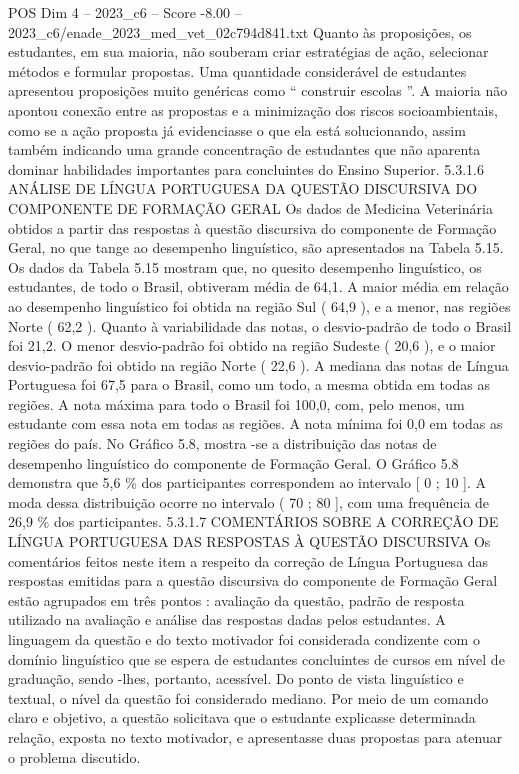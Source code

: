 \begin{textsample}{POS Dim 4 – 2023\_c6 – Score -8.00 – 2023\_c6/enade\_2023\_med\_vet\_02c794d841.txt}
Quanto às proposições, os estudantes, em sua maioria, não souberam criar estratégias de ação, selecionar métodos e formular propostas.
Uma quantidade considerável de estudantes apresentou proposições muito genéricas como “ construir escolas ”.
A maioria não apontou conexão entre as propostas e a minimização dos riscos socioambientais, como se a ação proposta já evidenciasse o que ela está solucionando, assim também indicando uma grande concentração de estudantes que não aparenta dominar habilidades importantes para concluintes do Ensino Superior. 5.3.1.6 ANÁLISE DE LÍNGUA PORTUGUESA DA QUESTÃO DISCURSIVA DO COMPONENTE DE FORMAÇÃO GERAL Os dados de Medicina Veterinária obtidos a partir das respostas à questão discursiva do componente de Formação Geral, no que tange ao desempenho linguístico, são apresentados na Tabela 5.15.
Os dados da Tabela 5.15 mostram que, no quesito desempenho linguístico, os estudantes, de todo o Brasil, obtiveram média de 64,1.
A maior média em relação ao desempenho linguístico foi obtida na região Sul ( 64,9 ), e a menor, nas regiões Norte ( 62,2 ).
Quanto à variabilidade das notas, o desvio-padrão de todo o Brasil foi 21,2.
O menor desvio-padrão foi obtido na região Sudeste ( 20,6 ), e o maior desvio-padrão foi obtido na região Norte ( 22,6 ).
A mediana das notas de Língua Portuguesa foi 67,5 para o Brasil, como um todo, a mesma obtida em todas as regiões.
A nota máxima para todo o Brasil foi 100,0, com, pelo menos, um estudante com essa nota em todas as regiões.
A nota mínima foi 0,0 em todas as regiões do país.
No Gráfico 5.8, mostra -se a distribuição das notas de desempenho linguístico do componente de Formação Geral.
O Gráfico 5.8 demonstra que 5,6 \% dos participantes correspondem ao intervalo [ 0 ; 10 ].
A moda dessa distribuição ocorre no intervalo ( 70 ; 80 ], com uma frequência de 26,9 \% dos participantes. 5.3.1.7 COMENTÁRIOS SOBRE A CORREÇÃO DE LÍNGUA PORTUGUESA DAS RESPOSTAS À QUESTÃO DISCURSIVA Os comentários feitos neste item a respeito da correção de Língua Portuguesa das respostas emitidas para a questão discursiva do componente de Formação Geral estão agrupados em três pontos : avaliação da questão, padrão de resposta utilizado na avaliação e análise das respostas dadas pelos estudantes.
A linguagem da questão e do texto motivador foi considerada condizente com o domínio linguístico que se espera de estudantes concluintes de cursos em nível de graduação, sendo -lhes, portanto, acessível.
Do ponto de vista linguístico e textual, o nível da questão foi considerado mediano.
Por meio de um comando claro e objetivo, a questão solicitava que o estudante explicasse determinada relação, exposta no texto motivador, e apresentasse duas propostas para atenuar o problema discutido.

\end{textsample}
